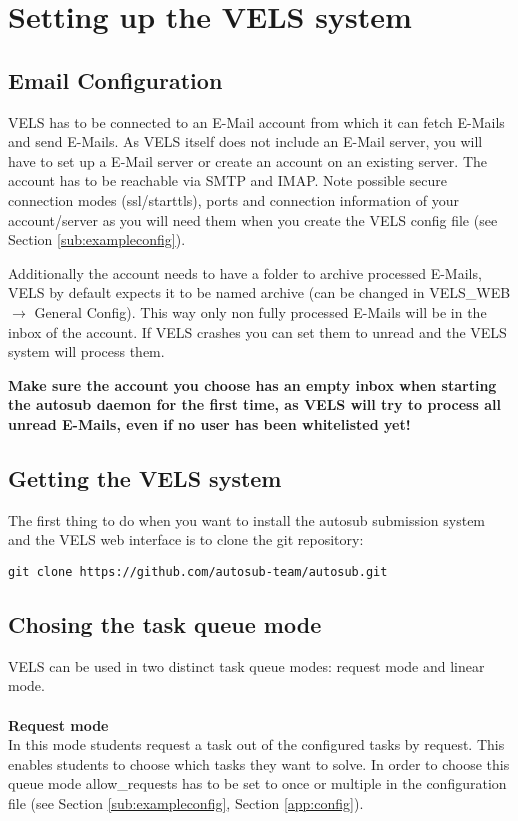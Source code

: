 \section{Setting up the VELS system} \label{system_setup}

\subsection{Email Configuration} \label{sub:emailconfig}
VELS has to be connected to an E-Mail account from which it can fetch E-Mails and send E-Mails.
As VELS itself does not include an E-Mail server, you will have to set up a E-Mail server or
create an account on an existing server. The account has to be reachable via SMTP and IMAP.
Note possible secure connection modes (ssl/starttls), ports and connection information of
your account/server as you will need them when you create the VELS config file (see
Section \ref{sub:exampleconfig}).

Additionally the account needs to have a folder to archive processed E-Mails, VELS by default
expects it to be named archive (can be changed in VELS\_WEB $\rightarrow$ General Config). This way
only non fully processed E-Mails will be in the inbox of the account. If VELS crashes
you can set them to unread and the VELS system will process them.

\textbf{Make sure the account you choose has an empty inbox when starting the autosub daemon for the
first time, as VELS will try to process all unread E-Mails, even if no user has been whitelisted yet!}

\subsection{Getting the VELS system} \label{sub:serversetup}

The first thing to do when you want to install the autosub submission system and the VELS
web interface is to clone the git repository:

\begin{verbatim}
git clone https://github.com/autosub-team/autosub.git
\end{verbatim}

\subsection{Chosing the task queue mode} \label{sub:task_queues}
VELS can be used in two distinct task queue modes: request mode and linear mode. \\
\\
\textbf{Request mode}\\
In this mode students request a task out of the configured tasks by request. This enables students to
choose which tasks they want to solve. In order to choose this queue mode allow\_requests has to be set to
once or multiple in the configuration file (see Section \ref{sub:exampleconfig}, Section \ref{app:config}).\\
\\

